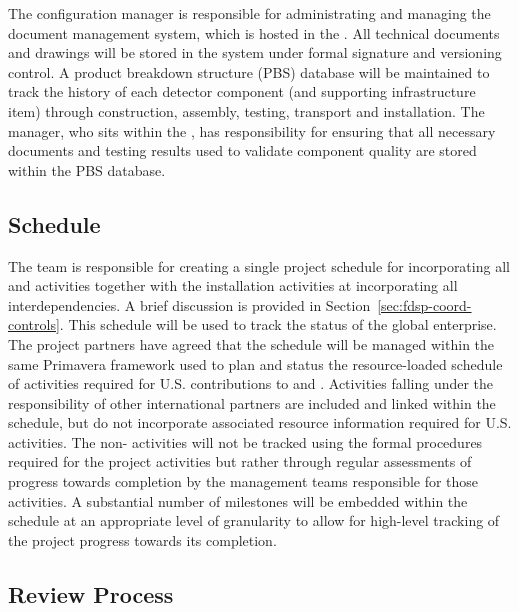 The configuration manager is responsible for administrating
and managing the  document management system, 
which is hosted in the .  All technical documents 
and drawings will be stored in the  system under 
formal signature and versioning control.  A product breakdown 
structure (PBS) database will be maintained to track the history 
of each detector component (and supporting infrastructure item) 
through construction, assembly, testing, transport and installation.  
The   manager, who sits within the 
, has responsibility for ensuring that all necessary 
documents and testing results used to validate component quality 
are stored within the PBS database.

\subsection{Schedule}
\label{sec:dune_schedule}

The  team is responsible for creating a single project
schedule for  incorporating all  and
 activities together with the installation activities at
 incorporating all interdependencies. A brief discussion
is provided in Section~\ref{sec:fdsp-coord-controls}. This schedule
will be used to track the status of the global enterprise.  The
project partners have agreed that the  schedule will
be managed within the same Primavera  framework used to plan
and status the resource-loaded schedule of activities required for
U.S.  contributions to  and .
Activities falling under the responsibility of other international
partners are included and linked within the 
schedule, but do not incorporate associated resource information
required for U.S.  activities.  The non-
activities will not be tracked using the formal 
procedures required for the  project activities but rather
through regular assessments of progress towards completion by the
management teams responsible for those activities.  A substantial
number of milestones will be embedded within the schedule at an
appropriate level of granularity to allow for high-level tracking of
the project progress towards its completion.

\subsection{Review Process}
\label{sec:dune_review}

